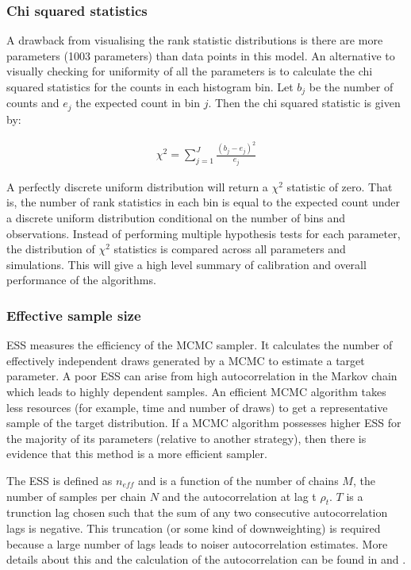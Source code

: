 \documentclass[12pt, a4paper]{article}
\begin{document}
            \subsubsection{Chi squared statistics}
            A drawback from visualising the rank statistic distributions is there are more parameters (1003 parameters) than data points in this model. An alternative to visually checking for uniformity of all the parameters is to calculate the chi squared statistics for the counts in each histogram bin. Let $b_j$ be the number of counts and $e_j$ the expected count in bin $j$. Then the chi squared statistic is given by:
            
            $$
            \begin{aligned}
            \chi^2 = \sum_{j=1}^J \frac{(b_{j} - e_{j})^2}{e_j}
            \end{aligned}
            $$
            
            A perfectly discrete uniform distribution will return a $\chi^2$ statistic of zero. That is, the number of rank statistics in each bin is equal to the expected count under a discrete uniform distribution conditional on the number of bins and observations. Instead of performing multiple hypothesis tests for each parameter, the distribution of $\chi^2$ statistics is compared across all parameters and simulations. This will give a high level summary of calibration and overall performance of the algorithms.

            \subsubsection{Effective sample size}
            ESS measures the efficiency of the MCMC sampler. It calculates the number of effectively independent draws generated by a MCMC to estimate a target parameter. A poor ESS can arise from high autocorrelation in the Markov chain which leads to highly dependent samples. An efficient MCMC algorithm takes less resources (for example, time and number of draws) to get a representative sample of the target distribution. If a MCMC algorithm possesses higher ESS for the majority of its parameters (relative to another strategy), then there is evidence that this method is a more efficient sampler.
            
            The ESS is defined as $n_{eff}$ and is a function of the number of chains $M$, the number of samples per chain $N$ and the autocorrelation at lag t $\rho_t$. $T$ is a trunction lag chosen such that the sum of any two consecutive autocorrelation lags is negative. This truncation (or some kind of downweighting) is required because a large number of lags leads to noiser autocorrelation estimates. More details about this and the calculation of the autocorrelation can be found in \citep{vehtari2021rank} and \citet{geyer1992practical}.
\end{document}
